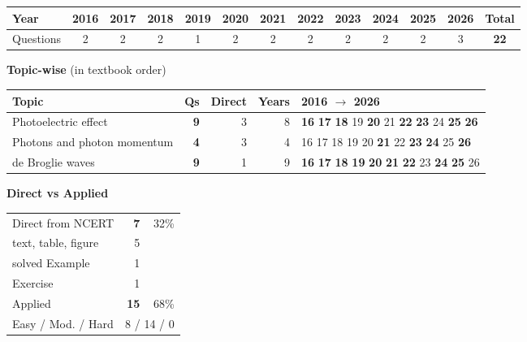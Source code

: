 {\small\setlength{\tabcolsep}{3.5pt}
\begin{tabular*}{\linewidth}{@{\extracolsep{\fill}}l*{11}{c}c@{}}\toprule
Year & 2016 & 2017 & 2018 & 2019 & 2020 & 2021 & 2022 & 2023 & 2024 & 2025 & 2026 & Total\\\midrule
Questions & 2 & 2 & 2 & 1 & 2 & 2 & 2 & 2 & 2 & 2 & 3 & \textbf{22}\\\bottomrule\end{tabular*}}\par\medskip
{\small\textbf{\color{crimson}Topic-wise} (in textbook order)\par\smallskip
\begin{tabularx}{\linewidth}{@{}>{\raggedright\arraybackslash}Xrrrl@{}}\toprule
Topic & Qs & Direct & Years & 2016 $\rightarrow$ 2026\\\midrule
Photoelectric effect & \textbf{9} & 3 & 8 & {\scriptsize \textbf{16} \textbf{17} \textbf{18} {\color{gray!45}19} \textbf{20} {\color{gray!45}21} \textbf{22} \textbf{23} {\color{gray!45}24} \textbf{25} \textbf{26}}\\
Photons and photon momentum & \textbf{4} & 3 & 4 & {\scriptsize {\color{gray!45}16} {\color{gray!45}17} {\color{gray!45}18} {\color{gray!45}19} {\color{gray!45}20} \textbf{21} {\color{gray!45}22} \textbf{23} \textbf{24} {\color{gray!45}25} \textbf{26}}\\
de Broglie waves & \textbf{9} & 1 & 9 & {\scriptsize \textbf{16} \textbf{17} \textbf{18} \textbf{19} \textbf{20} \textbf{21} \textbf{22} {\color{gray!45}23} \textbf{24} \textbf{25} {\color{gray!45}26}}\\
\bottomrule\end{tabularx}}\par\medskip
\begin{minipage}[t]{0.34\linewidth}{\small\textbf{\color{crimson}Direct vs Applied}\par\smallskip
\begin{tabular}{@{}lrr@{}}\toprule
Direct from NCERT & \textbf{7} & 32\%\\
\quad text, table, figure & 5 &\\
\quad solved Example & 1 &\\
\quad Exercise & 1 &\\
Applied & \textbf{15} & 68\%\\\midrule
Easy / Mod. / Hard & \multicolumn{2}{r}{8 / 14 / 0}\\\bottomrule
\end{tabular}}\end{minipage}\hfill
